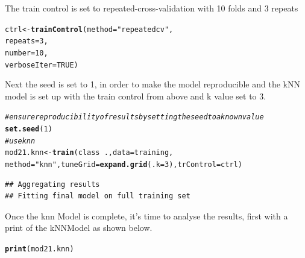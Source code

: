 \documentclass[10pt  ,usenames, dvipsnames]{article}\usepackage[]{graphicx}\usepackage[]{color}
\makeatletter
\newcommand{\hlnum}[1]{\textcolor[rgb]{0.686,0.059,0.569}{#1}}%
\newcommand{\hlstr}[1]{\textcolor[rgb]{0.192,0.494,0.8}{#1}}%
\newcommand{\hlcom}[1]{\textcolor[rgb]{0.678,0.584,0.686}{\textit{#1}}}%
\newcommand{\hlopt}[1]{\textcolor[rgb]{0,0,0}{#1}}%
\newcommand{\hlstd}[1]{\textcolor[rgb]{0.345,0.345,0.345}{#1}}%
\newcommand{\hlkwb}[1]{\textcolor[rgb]{0.69,0.353,0.396}{#1}}%
\newcommand{\hlkwc}[1]{\textcolor[rgb]{0.333,0.667,0.333}{#1}}%
\newcommand{\hlkwd}[1]{\textcolor[rgb]{0.737,0.353,0.396}{\textbf{#1}}}%
\newenvironment{kframe}{%
 \def\at@end@of@kframe{}%
 \ifinner\ifhmode%
  \def\at@end@of@kframe{\end{minipage}}%
  \begin{minipage}{\columnwidth}%
 \fi\fi%
 \def\FrameCommand##1{\hskip\@totalleftmargin \hskip-\fboxsep
 \colorbox{shadecolor}{##1}\hskip-\fboxsep
     \hskip-\linewidth \hskip-\@totalleftmargin \hskip\columnwidth}%
 \MakeFramed {\advance\hsize-\width
   \@totalleftmargin\z@ \linewidth\hsize
   \@setminipage}}%
 {\par\unskip\endMakeFramed%
 \at@end@of@kframe}
\newenvironment{knitrout}{}{} %
\makeatother
\begin{document}
The train control is set to repeated-cross-validation with 10 folds and 3 repeats
\begin{knitrout}
\color{fgcolor}\begin{kframe}
\begin{alltt}
\hlstd{ctrl} \hlkwb{<-} \hlkwd{trainControl}\hlstd{(}\hlkwc{method} \hlstd{=} \hlstr{"repeatedcv"}\hlstd{,}
                     \hlkwc{repeats} \hlstd{=} \hlnum{3}\hlstd{,}
                     \hlkwc{number} \hlstd{=} \hlnum{10}\hlstd{,}
                     \hlkwc{verboseIter}\hlstd{=}\hlnum{TRUE}\hlstd{)}
\end{alltt}
\end{kframe}
\end{knitrout}



Next the seed is set to 1, in order to make the model reproducible and the kNN model is set up with the train control from above and k value set to 3.

\begin{knitrout}
\color{fgcolor}\begin{kframe}
\begin{alltt}
\hlcom{# ensure reproducibility of results by setting the seed to a known value}
\hlkwd{set.seed}\hlstd{(}\hlnum{1}\hlstd{)}
\hlcom{#use knn}
\hlstd{mod21.knn}\hlkwb{<-} \hlkwd{train}\hlstd{(class}\hlopt{~}\hlstd{.,} \hlkwc{data}\hlstd{=training,}
                  \hlkwc{method}\hlstd{=}\hlstr{"knn"}\hlstd{,} \hlkwc{tuneGrid}\hlstd{=}\hlkwd{expand.grid}\hlstd{(}\hlkwc{.k}\hlstd{=}\hlnum{3}\hlstd{),}\hlkwc{trControl}\hlstd{=ctrl)}
\end{alltt}
\end{kframe}
\end{knitrout}

\begin{knitrout}
\color{fgcolor}\begin{kframe}
\begin{verbatim}
## Aggregating results
## Fitting final model on full training set
\end{verbatim}
\end{kframe}
\end{knitrout}


\clearpage

Once the knn Model is complete, it’s time to analyse the results, first with a print of the kNNModel as shown below.
\begin{knitrout}
\color{fgcolor}\begin{kframe}
\begin{alltt}
\hlkwd{print}\hlstd{(mod21.knn)}
\end{alltt}
\end{kframe}
\end{knitrout}
\end{document}
